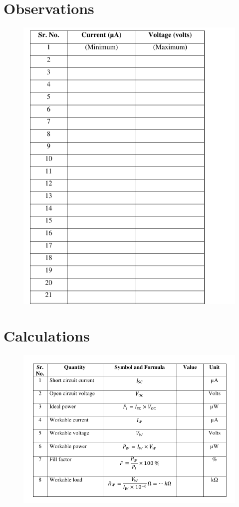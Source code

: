 \documentclass[12pt]{article}
\begin{document}
\section{Observations}

\begin{figure}[H]
	\centering
	\includegraphics[scale=0.9]{obs.png}
	\label{it}
\end{figure}

\section{Calculations}

\begin{figure}[H]
	\centering
	\includegraphics[scale=0.9]{calc2.png}
	\label{it}
\end{figure}
\end{document}
